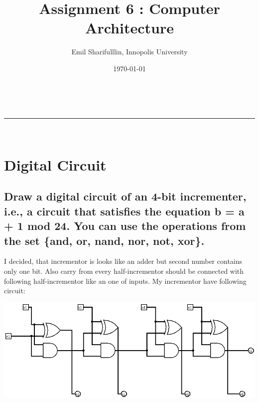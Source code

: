 \documentclass[a4paper,11pt]{article}
\makeatletter
\newcommand*{\TitleFont}{%
      \usefont{\encodingdefault}{\rmdefault}{b}{n}%
      \fontsize{16}{20}%
      \selectfont}
\renewcommand{\maketitle}{
\begin{center}
\vspace{2ex}
{\huge \textsc{\@title}}
\vspace{1ex}
\\
\rule{\linewidth}{0.5pt}\\
\@author \hfill \@date
\vspace{4ex}
\end{center}
}
\makeatother
\begin{document}






\title{ \TitleFont Assignment 6 : Computer Architecture }

\author{Emil Sharifulllin, Innopolis University}

\date{\today}

\maketitle
\tableofcontents

\section{Digital Circuit}

\subsection{Draw a digital circuit of an 4-bit incrementer, i.e., a circuit that satisfies the equation b = a + 1 mod 24. You can use the operations from the set \{and, or, nand, nor, not, xor\}.}

I decided, that incrementor is looks like an adder but second number contains only one bit. Also carry from every half-incrementor should be connected with following half-incrementor like an one of inputs. My incrementor have following circuit:

\begin{center}
\includegraphics[width=15cm]{incrementor}
\end{center}
\end{document}
